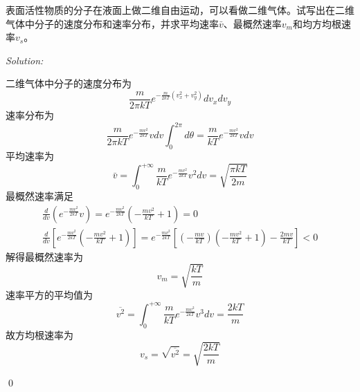 \documentclass[12pt,a4paper]{article}
\newenvironment{problem}[2][Problem]{\begin{trivlist}
\item[\hskip \labelsep {\bfseries #1}\hskip \labelsep {\bfseries #2.}]}{\end{trivlist}}
\newenvironment{sol}
    {\emph{Solution:}
    }
    {
    \qed
    }
\begin{document}
\begin{problem}{7.11}
表面活性物质的分子在液面上做二维自由运动，可以看做二维气体。试写出在二维气体中分子的速度分布和速率分布，并求平均速率$\bar{v}$、最概然速率$v_m$和均方均根速率$v_s$。
\end{problem}
\begin{sol}
二维气体中分子的速度分布为
\begin{equation}
\frac{m}{2\pi kT}e^{-\frac{m}{2kT}(v_x^2+v_y^2)}dv_xdv_y
\end{equation}
速率分布为
\begin{equation}
\frac{m}{2\pi kT}e^{-\frac{mv^2}{2kT}}vdv\int_0^{2\pi}d\theta=\frac{m}{kT}e^{-\frac{mv^2}{2kT}}vdv
\end{equation}
平均速率为
\begin{equation}
\bar{v}=\int_0^{+\infty}\frac{m}{kT}e^{-\frac{mv^2}{2kT}}v^2dv=\sqrt{\frac{\pi kT}{2m}}
\end{equation}
最概然速率满足
\begin{gather}
\frac{d}{dv}\left(e^{-\frac{mv^2}{2kT}}v\right)=e^{-\frac{mv^2}{2kT}}\left(-\frac{mv^2}{kT}+1\right)=0\\
\frac{d}{dv}\left[e^{-\frac{mv^2}{2kT}}\left(-\frac{mv^2}{kT}+1\right)\right]=e^{-\frac{mv^2}{2kT}}\left[\left(-\frac{mv}{kT}\right)\left(-\frac{mv^2}{kT}+1\right)-\frac{2mv}{kT}\right]<0
\end{gather}
解得最概然速率为
\begin{equation}
v_m=\sqrt{\frac{kT}{m}}
\end{equation}
速率平方的平均值为
\begin{equation}
\overline{v^2}=\int_0^{+\infty}\frac{m}{kT}e^{-\frac{mv^2}{2kT}}v^3dv=\frac{2kT}{m}
\end{equation}
故方均根速率为
\begin{equation}
v_s=\sqrt{\overline{v^2}}=\sqrt{\frac{2kT}{m}}
\end{equation}
\end{sol}
\end{document}
